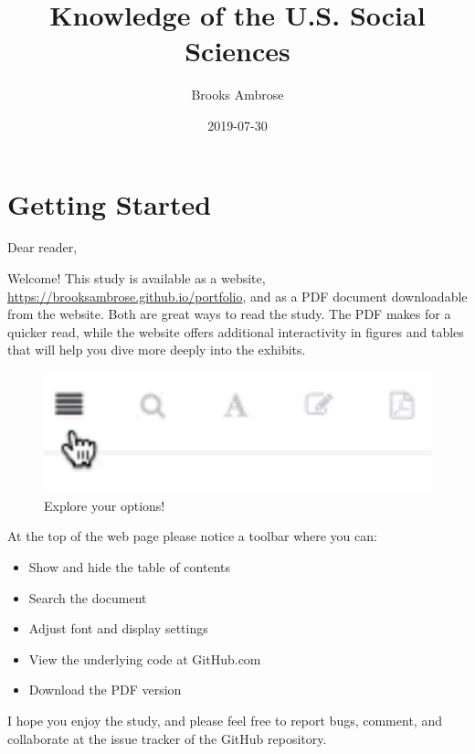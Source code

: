 \documentclass[]{book}
\title{Knowledge of the U.S. Social Sciences}
\author{Brooks Ambrose}
\date{2019-07-30}
\providecommand{\tightlist}{%
  \setlength{\itemsep}{0pt}\setlength{\parskip}{0pt}}
\theoremstyle{definition}
\theoremstyle{definition}
\theoremstyle{definition}
\theoremstyle{remark}
\begin{document}
\maketitle

{
\setcounter{tocdepth}{2}
\tableofcontents
}
\listoftables
\listoffigures
\hypertarget{getting-started}{%
\chapter*{Getting Started}\label{getting-started}}


Dear reader,

Welcome! This study is available as a website,
\url{https://brooksambrose.github.io/portfolio}, and as a PDF document
downloadable from the website. Both are great ways to read the study.
The PDF makes for a quicker read, while the website offers additional
interactivity in figures and tables that will help you dive more deeply
into the exhibits.

\begin{figure}

{\centering \includegraphics[width=0.9\linewidth]{img/toolbar} 

}

\caption{Explore your options!}\label{fig:toolbar}
\end{figure}

At the top of the web page please notice a toolbar where you can:

\begin{itemize}
\tightlist
\item
  Show and hide the table of contents
\item
  Search the document
\item
  Adjust font and display settings
\item
  View the underlying code at GitHub.com
\item
  Download the PDF version
\end{itemize}

I hope you enjoy the study, and please feel free to report bugs,
comment, and collaborate at the issue tracker of the GitHub repository.
\end{document}
